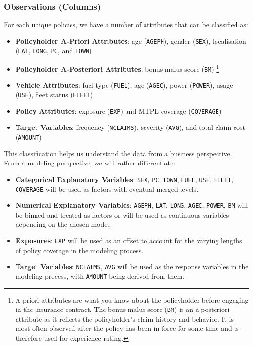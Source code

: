 \documentclass[
  english,
  11pt,
]{article}
\providecommand{\tightlist}{%
  \setlength{\itemsep}{0pt}\setlength{\parskip}{0pt}}
\begin{document}
\subsubsection{Observations (Columns)}\label{observations-columns}

For each unique policies, we have a number of attributes that can be
classified as:

\begin{itemize}
\tightlist
\item
  \textbf{Policyholder A-Priori Attributes}: age (\texttt{AGEPH}),
  gender (\texttt{SEX}), localisation (\texttt{LAT}, \texttt{LONG},
  \texttt{PC}, and \texttt{TOWN})
\item
  \textbf{Policyholder A-Posteriori Attributes}: bonus-malus score
  (\texttt{BM}) \footnote{A-priori attributes are what you know about
    the policyholder before engaging in the insurance contract. The
    bonus-malus score (\texttt{BM}) is an a-posteriori attribute as it
    reflects the policyholder's claim history and behavior. It is most
    often observed after the policy has been in force for some time and
    is therefore used for experience rating.}
\item
  \textbf{Vehicle Attributes}: fuel type (\texttt{FUEL}), age
  (\texttt{AGEC}), power (\texttt{POWER}), usage (\texttt{USE}), fleet
  status (\texttt{FLEET})
\item
  \textbf{Policy Attributes}: exposure (\texttt{EXP}) and MTPL coverage
  (\texttt{COVERAGE})
\item
  \textbf{Target Variables}: frequency (\texttt{NCLAIMS}), severity
  (\texttt{AVG}), and total claim cost (\texttt{AMOUNT})
\end{itemize}

This classification helps us understand the data from a business
perspective. From a modeling perspective, we will rather differentiate:

\begin{itemize}
\tightlist
\item
  \textbf{Categorical Explanatory Variables}: \texttt{SEX}, \texttt{PC},
  \texttt{TOWN}, \texttt{FUEL}, \texttt{USE}, \texttt{FLEET},
  \texttt{COVERAGE} will be used as factors with eventual merged levels.
\item
  \textbf{Numerical Explanatory Variables}: \texttt{AGEPH},
  \texttt{LAT}, \texttt{LONG}, \texttt{AGEC}, \texttt{POWER},
  \texttt{BM} will be binned and treated as factors or will be used as
  continuous variables depending on the chosen model.
\item
  \textbf{Exposures}: \texttt{EXP} will be used as an offset to account
  for the varying lengths of policy coverage in the modeling process.
\item
  \textbf{Target Variables}: \texttt{NCLAIMS}, \texttt{AVG} will be used
  as the response variables in the modeling process, with
  \texttt{AMOUNT} being derived from them.
\end{itemize}
\end{document}
